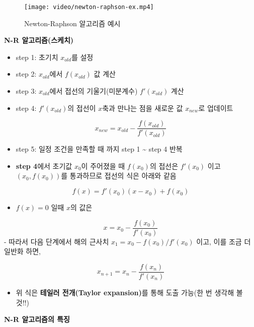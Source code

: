 \documentclass[
  11pt,
]{krantz}
\providecommand{\tightlist}{%
  \setlength{\itemsep}{0pt}\setlength{\parskip}{0pt}}
\begin{document}
\begin{figure}
\centering
\texttt{[image: video/newton-raphson-ex.mp4]}
\caption{Newton-Raphson 알고리즘 예시}
\end{figure}

\textbf{N-R 알고리즘(스케치)}

\begin{itemize}
\item
  step 1: 초기치 \(x_{old}\)를 설정
\item
  step 2: \(x_{old}\)에서 \(f(x_{old})\) 값 계산
\item
  step 3: \(x_{old}\)에서 접선의 기울기(미분계수) \(f'(x_{old})\) 계산
\item
  step 4: \(f'(x_{old})\)의 접선이 \(x\)축과 만나는 점을 새로운 값 \(x_{new}\)로 업데이트
\end{itemize}

\[
 x_{new} = x_{old} - \frac{f(x_{old})}{f'(x_{old})}
\]

\begin{itemize}
\item
  step 5: 일정 조건을 만족할 때 까지 step 1 \textasciitilde{} step 4 반복
\item
  \textbf{step 4}에서 초기값 \(x_0\)이 주어졌을 때 \(f(x_0)\)의 접선은 \(f'(x_0)\) 이고 \((x_0, f(x_0))\)를 통과하므로 접선의 식은 아래와 같음
\end{itemize}

\[
f(x) = f'(x_0)(x - x_0) + f(x_0)
\]

\begin{itemize}
\tightlist
\item
  \(f(x) = 0\) 일때 \(x\)의 값은
\end{itemize}

\[
 x = x_0 -\frac{f(x_0)}{f'(x_0)}
\]
- 따라서 다음 단계에서 해의 근사치 \(x_{1} = x_0 - f(x_0)/f'(x_0)\) 이고, 이를 조금 더 일반화 하면,

\[
 x_{n+1} = x_n - \frac{f(x_n)}{f'(x_n)}
\]

\begin{itemize}
\tightlist
\item
  위 식은 \textbf{테일러 전개(Taylor expansion)}를 통해 도출 가능(한 번 생각해 볼 것!!)
\end{itemize}

\textbf{N-R 알고리즘의 특징}
\end{document}
